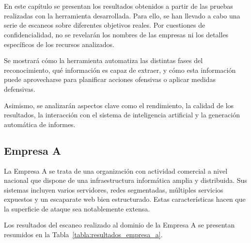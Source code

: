 \chapter{\resultsname}
\label{chapter:resultados}
\newpage
\begin{parskipenv}
En este capítulo se presentan los resultados obtenidos a partir de las pruebas realizadas con la herramienta desarrollada. Para ello, se han llevado a cabo una serie de escaneos sobre diferentes objetivos reales. Por cuestiones de confidencialidad, no se revelarán los nombres de las empresas ni los detalles específicos de los recursos analizados.

Se mostrará cómo la herramienta automatiza las distintas fases del reconocimiento, qué información es capaz de extraer, y cómo esta información puede aprovecharse para planificar acciones ofensivas o aplicar medidas defensivas.

Asimismo, se analizarán aspectos clave como el rendimiento, la calidad de los resultados, la interacción con el sistema de inteligencia artificial y la generación automática de informes.

\section{Empresa A}
La Empresa A se trata de una organización con actividad comercial a nivel nacional que dispone de una infraestructura informática amplia y distribuida. Sus sistemas incluyen varios servidores, redes segmentadas, múltiples servicios expuestos y un escaparate web bien estructurado. Estas características hacen que la superficie de ataque sea notablemente extensa.

Los resultados del escaneo realizado al dominio de la Empresa A se presentan resumidos en la Tabla~\ref{tabla:resultados_empresa_a}.


\end{parskipenv}
